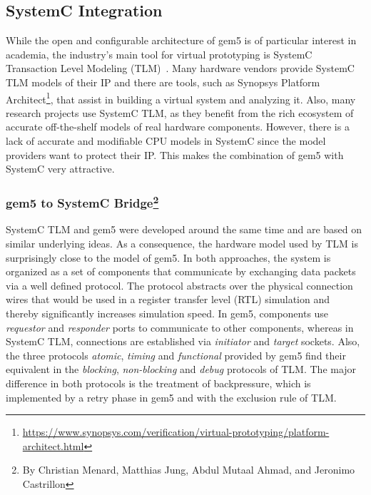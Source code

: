 \subsection[SystemC Integration]{SystemC Integration}
\label{sec:systemc}

While the open and configurable architecture of gem5 is of particular interest
in academia, the industry's main tool for virtual prototyping is SystemC
Transaction Level Modeling (TLM)~\cite{systemc_ieee11}. Many hardware vendors
provide SystemC TLM models of their IP and there are tools, such as Synopsys
Platform Architect\footnote{\url{https://www.synopsys.com/verification/virtual-prototyping/platform-architect.html}},
that assist in building a virtual system and analyzing it. Also, many research
projects use SystemC TLM, as they benefit from the rich ecosystem of accurate
off-the-shelf models of real hardware components. However, there is a lack of
accurate and modifiable CPU models in SystemC since the model providers want to
protect their IP. This makes the combination of gem5 with SystemC very
attractive.

\subsubsection[gem5 to SystemC Bridge]{gem5 to SystemC Bridge\footnote{By Christian Menard, Matthias Jung, Abdul Mutaal Ahmad, and Jeronimo Castrillon}}

SystemC TLM and gem5 were developed around the same time and are based on
similar underlying ideas. As a consequence, the hardware model used by TLM is
surprisingly close to the model of gem5. In both approaches, the system is
organized as a set of components that communicate by exchanging data packets
via a well defined protocol. The protocol abstracts over the physical
connection wires that would be used in a register transfer level (RTL)
simulation and thereby significantly increases simulation speed. In gem5,
components use \emph{requestor} and \emph{responder} ports to communicate to other
components, whereas in SystemC TLM, connections are established via
\emph{initiator} and \emph{target} sockets. Also, the three protocols
\emph{atomic}, \emph{timing} and \emph{functional} provided by gem5 find their
equivalent in the \emph{blocking}, \emph{non-blocking} and \emph{debug}
protocols of TLM. The major difference in both protocols is the treatment of
backpressure, which is implemented by a retry phase in gem5 and with the
exclusion rule of TLM.

